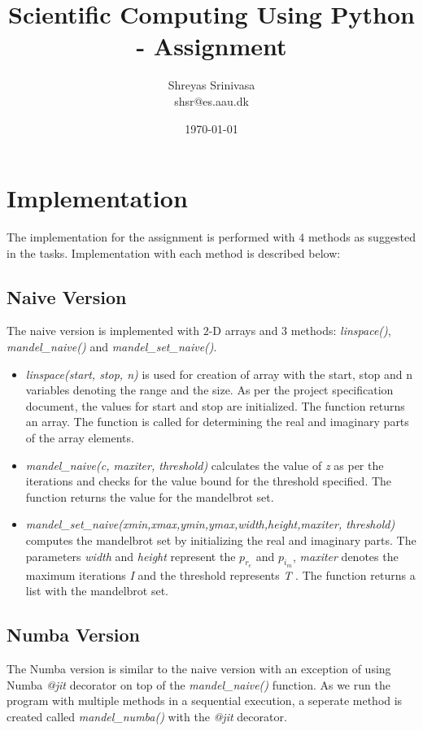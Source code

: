 \documentclass{article}
\title{Scientific Computing Using Python - Assignment}
\author{Shreyas Srinivasa \\ shsr@es.aau.dk}
\date{\today}
\begin{document}
\maketitle

\section{Implementation}
The implementation for the assignment is performed with $4$ methods as suggested in the tasks. Implementation with each method is described below:

\subsection{Naive Version}
The naive version is implemented with $2$-D arrays and $3$ methods: \textit{linspace()}, \textit{mandel\_naive()} and \textit{mandel\_set\_naive()}.
\begin{itemize}
    \item \textit{linspace(start, stop, n)} is used for creation of array with the start, stop and n variables denoting the range and the size. As per the project specification document, the values for start and stop are initialized. The function returns an array. The function is called for determining the real and imaginary parts of the array elements.
    \item \textit{mandel\_naive(c, maxiter, threshold)} calculates the value of \textit{z} as per the iterations and checks for the value bound for the threshold specified. The function returns the value for the mandelbrot set.
    \item \textit{mandel\_set\_naive(xmin,xmax,ymin,ymax,width,height,maxiter, threshold)} computes the mandelbrot set by initializing the real and imaginary parts. The parameters \textit{width} and \textit{height} represent the $p_{r_e}$ and $p_{i_m}$, \textit{maxiter} denotes the maximum iterations \textit{I} and the threshold represents \textit{T} . The function returns a list with the mandelbrot set. 
\end{itemize}

 
\subsection{Numba Version}
The Numba version is similar to the naive version with an exception of using Numba \textit{@jit} decorator on top of the \textit{mandel\_naive()} function. As we run the program with multiple methods in a sequential execution, a seperate method is created called \textit{mandel\_numba()} with the \textit{@jit} decorator.
\end{document}
